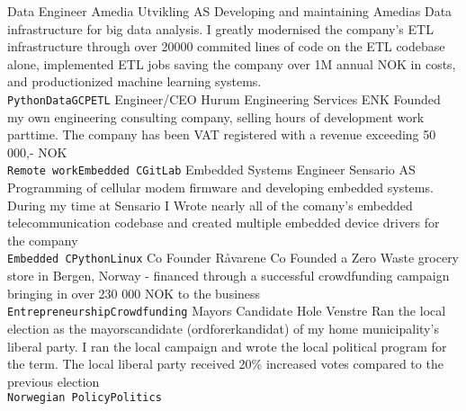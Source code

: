 \documentclass[9pt]{developercv} %
\begin{document}
\begin{entrylist}
	\entry
		{Data Engineer}
		{Amedia Utvikling AS}
		{Developing and maintaining Amedias Data infrastructure for big data analysis. I greatly modernised the 
    company's ETL infrastructure through over 20000 commited lines of code on the ETL
    codebase alone, implemented ETL jobs saving the company over 1M annual NOK in costs, and productionized
    machine learning systems.
    \\ \texttt{Python}\slashsep\texttt{Data}\slashsep\texttt{GCP}\slashsep\texttt{ETL}}
	\entry
		{Engineer/CEO}
		{Hurum Engineering Services ENK}
		{Founded my own engineering consulting company, selling hours of development
    work parttime. The company has been VAT registered with a revenue exceeding 50 000,- NOK
    \\ \texttt{Remote work}\slashsep\texttt{Embedded C}\slashsep\texttt{GitLab}}
	\entry
		{Embedded Systems Engineer}
		{Sensario AS}
		{Programming of cellular modem firmware and developing embedded systems. During my time at Sensario I
     Wrote nearly all of the comany's embedded telecommunication codebase and 
     created multiple embedded device drivers for the company 
     \\ \texttt{Embedded C}\slashsep\texttt{Python}\slashsep\texttt{Linux}}
	 \entry
		 {Co Founder}
     {Råvarene}
		 {Co Founded a Zero Waste grocery store in Bergen, Norway - financed through a successful
      crowdfunding campaign bringing in over 230 000 NOK to the business\\ \texttt{Entrepreneurship}\slashsep\texttt{Crowdfunding}}
	\entry
		{Mayors Candidate}
    {Hole Venstre}
    {Ran the local election as the mayorscandidate (ordforerkandidat) of my home municipality's liberal party.
     I ran the local campaign and wrote the local political program for the term.  The local liberal party
     received 20\% increased votes compared to the previous election\\ \texttt{Norwegian Policy}\slashsep\texttt{Politics}}
\end{entrylist}


\end{document}
